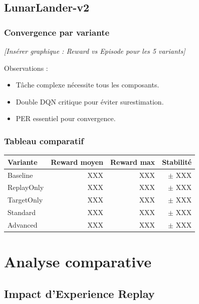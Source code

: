 \documentclass[12pt,a4paper]{article}
\begin{document}
\subsection{LunarLander-v2}

\subsubsection{Convergence par variante}

\textit{[Insérer graphique : Reward vs Episode pour les 5 variants]}

Observations :
\begin{itemize}
    \item Tâche complexe nécessite tous les composants.
    \item Double DQN critique pour éviter surestimation.
    \item PER essentiel pour convergence.
\end{itemize}

\subsubsection{Tableau comparatif}

\begin{center}
\begin{tabular}{|l|r|r|r|}
\hline
\textbf{Variante} & \textbf{Reward moyen} & \textbf{Reward max} & \textbf{Stabilité} \\
\hline
Baseline & XXX & XXX & $\pm$ XXX \\
ReplayOnly & XXX & XXX & $\pm$ XXX \\
TargetOnly & XXX & XXX & $\pm$ XXX \\
Standard & XXX & XXX & $\pm$ XXX \\
Advanced & XXX & XXX & $\pm$ XXX \\
\hline
\end{tabular}
\end{center}

\section{Analyse comparative}

\subsection{Impact d'Experience Replay}
\end{document}
